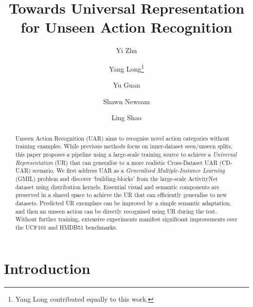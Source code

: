 \documentclass[10pt,twocolumn,letterpaper]{article}
\begin{document}
\title{Towards Universal Representation for Unseen Action Recognition}

	\author[1]{Yi Zhu}
	\author[2]{Yang Long\thanks{Yang Long contributed equally to this work.}}
	\author[2]{Yu Guan}
	\author[1]{Shawn Newsam}
	\author[3]{Ling Shao}
	






\maketitle
\thispagestyle{empty}

\begin{abstract}
	Unseen Action Recognition (UAR) aims to recognise novel action categories without training examples. While previous methods focus on inner-dataset seen/unseen splits, this paper proposes a pipeline using a large-scale training source to achieve a \textit{Universal Representation} (UR) that can generalise to a more realistic Cross-Dataset UAR (CD-UAR) scenario. We first address UAR as a \textit{Generalised Multiple-Instance Learning} (GMIL) problem and discover `building-blocks' from the large-scale ActivityNet dataset using distribution kernels. Essential visual and semantic components are preserved in a shared space to achieve the UR that can efficiently generalise to new datasets. Predicted UR exemplars can be improved by a simple semantic adaptation, and then an unseen action can be directly recognised using UR during the test. Without further training, extensive experiments manifest significant improvements over the UCF101 and HMDB51 benchmarks.
\end{abstract}

\section{Introduction}
\end{document}
